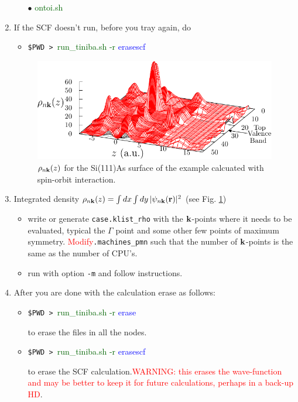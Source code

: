 \documentclass[12pt]{article}
\numberwithin{equation}{section}
\begin{document}
\begin{enumerate}
\begin{itemize}
$\bullet$ \textcolor{darkgreen}{ontoi.sh}

\end{itemize}

\item If the SCF doesn't run, before you tray again, do
\begin{itemize}
\item\verb=$PWD > =\textcolor{darkgreen}{run\_tiniba.sh -r} \textcolor{blue}{erasescf}
\end{itemize}

\begin{figure}[t]
\begin{center}
\includegraphics[scale=1.0]{plots/3drho}
\end{center}
\caption{$\rho_{n\mathbf{k}}(z)$ for the Si(111)As surface of the example 
  calcuated with spin-orbit interaction. 
}
\label{figrho}
\end{figure}

\item Integrated density  $\rho_{n\mathbf{k}}(z)=\int dx\int
  dy\,|\psi_{n\mathbf{k}}(\mathbf{r})|^2$ (see Fig. \ref{figrho}) 

\begin{itemize}
\item
 write or generate \verb=case.klist_rho= with the
 $\mathbf{k}$-points where it
needs to be evaluated, typical the $\Gamma$ point and some other few
points of maximum
symmetry. \textcolor{red}{Modify}\verb=.machines_pmn= such that the
number of $\mathbf{k}$-points is the same as the number of CPU's.
\item run with option \verb=-m= and follow instructions.
\end{itemize}
\item After you are done with the calculation erase as follows:
\begin{itemize}
\item\verb=$PWD > =\textcolor{darkgreen}{run\_tiniba.sh -r} \textcolor{blue}{erase}

to erase the files in all the nodes.

\item\verb=$PWD > =\textcolor{darkgreen}{run\_tiniba.sh -r} \textcolor{blue}{erasescf}

to erase the SCF calculation.\textcolor{red}{WARNING: this erases the wave-function and may
 be better to keep it for future calculations, perhaps in a back-up HD}.

\end{itemize}

\end{enumerate}
\end{document}
